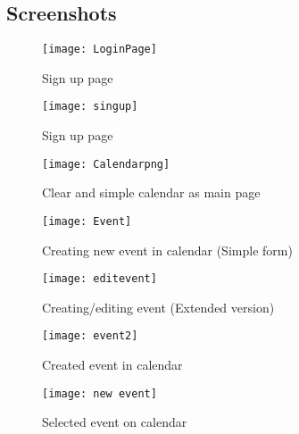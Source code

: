  \subsection{Screenshots}
 
 \par
 
 \begin{figure}[h]
 	\centering
 	\texttt{[image: LoginPage]}
 	\caption{Sign up page}	
 \end{figure}

\par

\begin{figure}[h]
	\centering
	\texttt{[image: singup]}
	\caption{Sign up page}	
\end{figure}

 \par

\begin{figure}[h]
	\centering
	\texttt{[image: Calendarpng]}
	\caption{Clear and simple calendar as main page}	
\end{figure}
 
 \par
 
 	\begin{figure}[h]
 		\centering
 		 \texttt{[image: Event]}
 		\caption{Creating new event in calendar (Simple form)}	
 	\end{figure}
 
  \par
 
 \begin{figure}[h]
 	\centering
 	\texttt{[image: editevent]}
 	\caption{Creating/editing event (Extended version)}	
 \end{figure}

 \par
 
 	\begin{figure}[h]
 		\centering
 	\texttt{[image: event2]}
 		\caption{Created event in calendar}	
 	\end{figure}
 


 \par
 
 	\begin{figure}[h]
 		\centering
 		 \texttt{[image: new event]}
 		\caption{Selected event on calendar}	
 	\end{figure}

